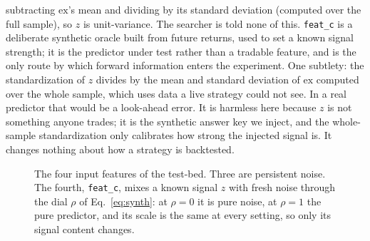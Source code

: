 \documentclass[11pt]{article}
\newcommand{\code}[1]{\texttt{#1}}
\begin{document}
subtracting $\mathrm{ex}$'s mean and dividing by its standard deviation (computed over the full sample),
so $z$ is unit-variance. The searcher is told none of this.
\code{feat\_c} is a deliberate synthetic oracle built from future returns, used to set a known signal
strength; it is the predictor under test rather than a tradable feature, and is the only route by
which forward information enters the experiment. One subtlety: the standardization of $z$ divides by the
mean and standard deviation of $\mathrm{ex}$ computed over the whole sample, which uses data a live
strategy could not see. In a real predictor that would be a look-ahead error. It is harmless here because
$z$ is not something anyone trades; it is the synthetic answer key we inject, and the whole-sample
standardization only calibrates how strong the injected signal is. It changes nothing about how a
strategy is backtested.

\begin{figure}[htbp]
\centering
{}
\caption{The four input features of the test-bed. Three are persistent noise. The fourth,
\code{feat\_c}, mixes a known signal $z$ with fresh noise through the dial $\rho$ of
Eq.~\eqref{eq:synth}: at $\rho=0$ it is pure noise, at $\rho=1$ the pure predictor, and its scale is the
same at every setting, so only its signal content changes.}
\label{fig:dial}
\end{figure}
\end{document}
